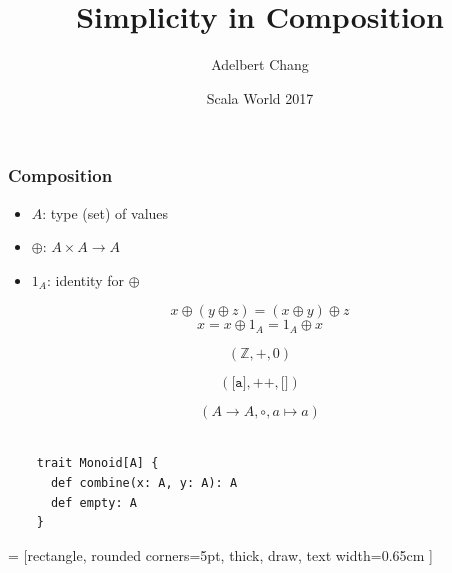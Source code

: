 \documentclass{beamer}
\title{Simplicity in Composition}
\author{Adelbert Chang}
\date{Scala World 2017}
\def\code#1{\texttt{#1}}
\begin{document}
\frame{\titlepage}

\begin{frame}

  \frametitle{Composition}
  \Large

  \begin{itemize}
    \item $A$: type (set) of values \pause
    \item $\oplus$: $A \times A \rightarrow A$ \pause
    \item $1_{A}$: identity for $\oplus$ \pause
  \end{itemize}

  $$x \oplus (y \oplus z) = (x \oplus y) \oplus z$$
  $$x = x \oplus 1_{A} = 1_{A} \oplus x$$

\end{frame}

\begin{frame} \LARGE $$(\mathbb{Z}, +, 0)$$ \end{frame}

\begin{frame} \LARGE $$(\code{[a]}, +\!\!+, \code{[]})$$ \end{frame}

\begin{frame} \LARGE $$(A \rightarrow A, \circ, a \mapsto a)$$ \end{frame}

\begin{frame}[fragile]
  \Large

  \begin{verbatim}

    trait Monoid[A] {
      def combine(x: A, y: A): A
      def empty: A
    }

  \end{verbatim}

\end{frame}

 = [rectangle, rounded corners=5pt, thick, draw, text width=0.65cm ]


\begin{frame}
  \centering


\end{frame}
\end{document}
